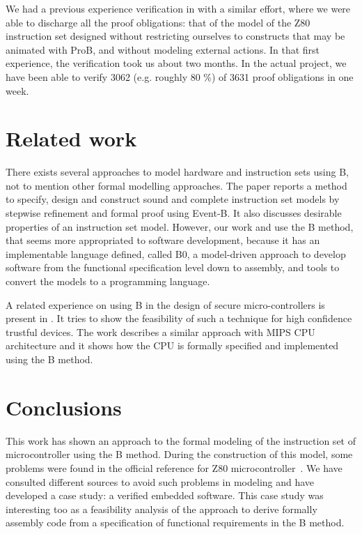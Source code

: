 \documentclass[a4paper]{llncs}
\begin{document}
We had a previous experience verification in \cite{Valerio_SBMF09} with
a similar effort, where we were able to discharge all the proof obligations: 
that of the model of the Z80 instruction set designed without restricting
ourselves to constructs that may be animated with ProB, and without
modeling external actions. In that first experience, the verification took us about two
months. In the actual project, we have been able to verify 3062
(e.g. roughly 80 \%) of 3631 proof obligations in one week.



\section{Related work}
\label{sec:relatedworks}

There exists several approaches to model hardware and instruction sets
using B, not to mention other formal modelling approaches.  The paper
\cite{springerlink:Yuan2011} reports a method to specify, design and
construct sound and complete instruction set models by stepwise
refinement and formal proof using Event-B. It also discusses desirable
properties of an instruction set model. However, our work
\cite{Valerio_SBMF09} and \cite{Subotic2010} use the B method, that
seems more appropriated to software development, because it has an
implementable language defined, called B0, a model-driven approach
\cite{Dantas_SBMF08} to develop software from the functional
specification level down to assembly, and tools to convert the models
to a programming language.

A related experience on using B in the design of secure
micro-controllers is present in \cite{Marc20113}. It tries to show the
feasibility of such a technique for high confidence trustful
devices. The work \cite{Subotic2010} describes a similar approach with
MIPS CPU architecture and it shows how the CPU is formally specified
and implemented using the B method.




 
\section{Conclusions}
\label{sec:conclusions} 

This work has shown an approach to the formal modeling of the
instruction set of microcontroller using the B method.  During the
construction of this model, some problems were found in the official
reference for Z80 microcontroller~\cite{Z80_manual}. We have consulted
different sources \cite{Simulator_z80,Z80_manual} to
avoid such problems in modeling and have developed a case study: a
verified embedded software.  This case study was interesting too as a
feasibility analysis of the approach to derive formally assembly code
from a specification of functional requirements in the B method.
\end{document}

